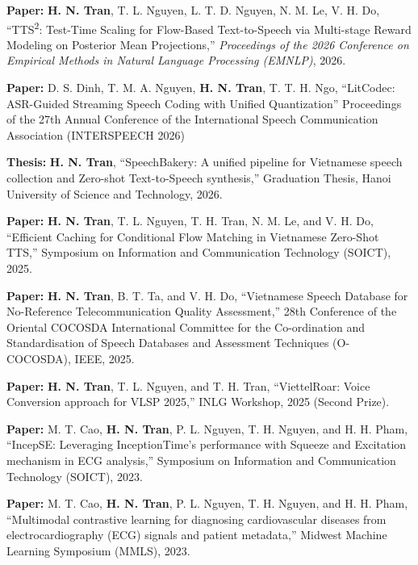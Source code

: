 

\begin{cvparagraph}

\textbf{Paper:} \textbf{H. N. Tran}, T. L. Nguyen, L. T. D. Nguyen, N. M. Le, V. H. Do,
``TTS\textsuperscript{2}: Test-Time Scaling for Flow-Based Text-to-Speech via Multi-stage Reward Modeling on Posterior Mean Projections,''
\textit{Proceedings of the 2026 Conference on Empirical Methods in Natural Language Processing (EMNLP)}, 2026.

\textbf{Paper:} D. S. Dinh, T. M. A. Nguyen, \textbf{H. N. Tran}, T. T. H. Ngo, “LitCodec: ASR-Guided Streaming Speech Coding with Unified Quantization” Proceedings of the 27th Annual Conference of the International Speech Communication Association (INTERSPEECH 2026)

\textbf{Thesis:} \textbf{H. N. Tran}, “SpeechBakery: A unified pipeline for Vietnamese speech collection and Zero-shot Text-to-Speech synthesis,” Graduation Thesis, Hanoi University of Science and Technology, 2026.

\textbf{Paper:} \textbf{H. N. Tran}, T. L. Nguyen, T. H. Tran, N. M. Le, and V. H. Do, “Efficient Caching for Conditional Flow Matching in Vietnamese Zero-Shot TTS,” Symposium on Information and Communication Technology (SOICT), 2025.

\textbf{Paper:} \textbf{H. N. Tran}, B. T. Ta, and V. H. Do, “Vietnamese Speech Database for No-Reference Telecommunication Quality Assessment,” 28th Conference of the Oriental COCOSDA International Committee for the Co-ordination and Standardisation of Speech Databases and Assessment Techniques (O-COCOSDA), IEEE, 2025.

\textbf{Paper:} \textbf{H. N. Tran}, T. L. Nguyen, and T. H. Tran, “ViettelRoar: Voice Conversion approach for VLSP 2025,” INLG Workshop, 2025 (Second Prize).

\textbf{Paper:} M. T. Cao, \textbf{H. N. Tran}, P. L. Nguyen, T. H. Nguyen, and H. H. Pham, “IncepSE: Leveraging InceptionTime's performance with Squeeze and Excitation mechanism in ECG analysis,” Symposium on Information and Communication Technology (SOICT), 2023.

\textbf{Paper:} M. T. Cao, \textbf{H. N. Tran}, P. L. Nguyen, T. H. Nguyen, and H. H. Pham, “Multimodal contrastive learning for diagnosing cardiovascular diseases from electrocardiography (ECG) signals and patient metadata,” Midwest Machine Learning Symposium (MMLS), 2023.

\end{cvparagraph}



